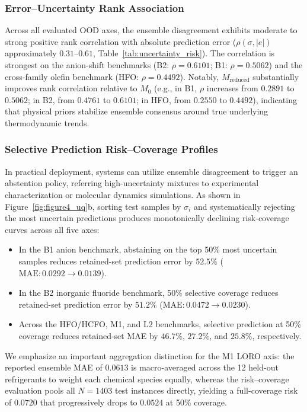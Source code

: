 \subsubsection{Error–Uncertainty Rank Association}
Across all evaluated OOD axes, the ensemble disagreement exhibits moderate to strong positive rank correlation with absolute prediction error ($\rho(\sigma, |e|)$ approximately $0.31\text{--}0.61$, Table~\ref{tab:uncertainty_risk}). The correlation is strongest on the anion-shift benchmarks (B2: $\rho = 0.6101$; B1: $\rho = 0.5062$) and the cross-family olefin benchmark (HFO: $\rho = 0.4492$). Notably, $M_{\mathrm{reduced}}$ substantially improves rank correlation relative to $M_0$ (e.g., in B1, $\rho$ increases from $0.2891$ to $0.5062$; in B2, from $0.4761$ to $0.6101$; in HFO, from $0.2550$ to $0.4492$), indicating that physical priors stabilize ensemble consensus around true underlying thermodynamic trends.

\subsubsection{Selective Prediction Risk–Coverage Profiles}
In practical deployment, systems can utilize ensemble disagreement to trigger an abstention policy, referring high-uncertainty mixtures to experimental characterization or molecular dynamics simulations. As shown in Figure~\ref{fig:figure4_uq}b, sorting test samples by $\sigma_i$ and systematically rejecting the most uncertain predictions produces monotonically declining risk-coverage curves across all five axes:
\begin{itemize}
    \item In the B1 anion benchmark, abstaining on the top 50\% most uncertain samples reduces retained-set prediction error by \textbf{$52.5\%$} ($\text{MAE}: 0.0292 \to 0.0139$).
    \item In the B2 inorganic fluoride benchmark, 50\% selective coverage reduces retained-set prediction error by \textbf{$51.2\%$} ($\text{MAE}: 0.0472 \to 0.0230$).
    \item Across the HFO/HCFO, M1, and L2 benchmarks, selective prediction at 50\% coverage reduces retained-set MAE by $46.7\%$, $27.2\%$, and $25.8\%$, respectively.
\end{itemize}

We emphasize an important aggregation distinction for the M1 LORO axis: the reported ensemble MAE of $0.0613$ is macro-averaged across the 12 held-out refrigerants to weight each chemical species equally, whereas the risk–coverage evaluation pools all $N=1403$ test instances directly, yielding a full-coverage risk of $0.0720$ that progressively drops to $0.0524$ at 50\% coverage.

